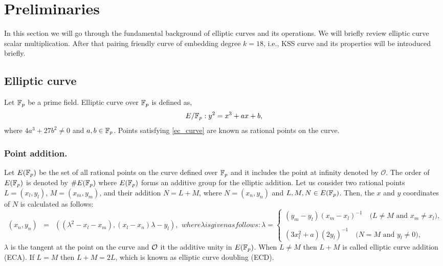 \section{Preliminaries}
In this section we will go through the fundamental background of elliptic curves and its operations. We will briefly review elliptic curve scalar multiplication. After that pairing friendly curve of embedding degree $k=18$, i.e., KSS curve and its properties will be introduced briefly.
\subsection{Elliptic curve \cite{ecc_book}}
Let ${\mathbb{F}}_{p}$ be a prime field. Elliptic curve over ${\mathbb{F}}_{p}$ is defined as,
\begin{equation}\label{ec_curve}
E/{\mathbb{F}}_{p} : y^2=x^3+ax+b,
\end{equation}
where $ 4a^3+27b^2 \neq 0$ and $a,b \in {\mathbb{F}}_{p}$. Points satisfying \eqref{ec_curve} are known as rational points on the curve.

\subsubsection{Point addition.}
Let $E({\mathbb{F}}_{p})$ be the set of all rational points on the curve defined over ${\mathbb{F}}_{p}$ and it includes the point at infinity denoted by $\mathcal{O}$.
The order of $E(\mathbb{F}_p)$ is denoted by $\#E(\mathbb{F}_p)$ where $E(\mathbb{F}_p)$ forms an additive group for the elliptic addition.
Let us consider two rational points $L = (x_l, y_l)$, $M = (x_m, y_m)$, and their addition $N = L + M$, where $\textit{N} = (x_n, y_n)$ and $L, M, N\in E({\mathbb{F}}_{p})$. Then, the $x$ and $y$ coordinates of $N$ is calculated as follows:
\begin{subequations}
\begin{eqnarray}\label{eq:point_add}
(x_n ,y_n) & = & ((\lambda^2-x_l-x_m ),  (x_l-x_n)\lambda - y_l), 
\end{eqnarray}
where \mbox{$\lambda$} is given as follows:
\begin{equation}\label{eq:point_solpe}
\textstyle \lambda = 
\begin{cases}
 \textstyle (y_m - y_l)(x_m -x_l)^{-1} \quad \mbox{($L \neq M$ and $x_m \neq x_l$)},\\\\
 \textstyle  (3x_l^2+a)(2y_l)^{-1} \quad  \mbox{($N = M$ and $y_l\neq 0$)} ,
\end{cases}
\end{equation}
\end{subequations}
$\lambda$ is the tangent at the point on the curve and $\cal O$ it the additive unity in $E({\mathbb{F}}_{p})$. When $L \neq M$ then $L+M$ is called elliptic curve addition (ECA). If $L=M$ then $L+M=2L$, which is known as elliptic curve doubling (ECD). 
